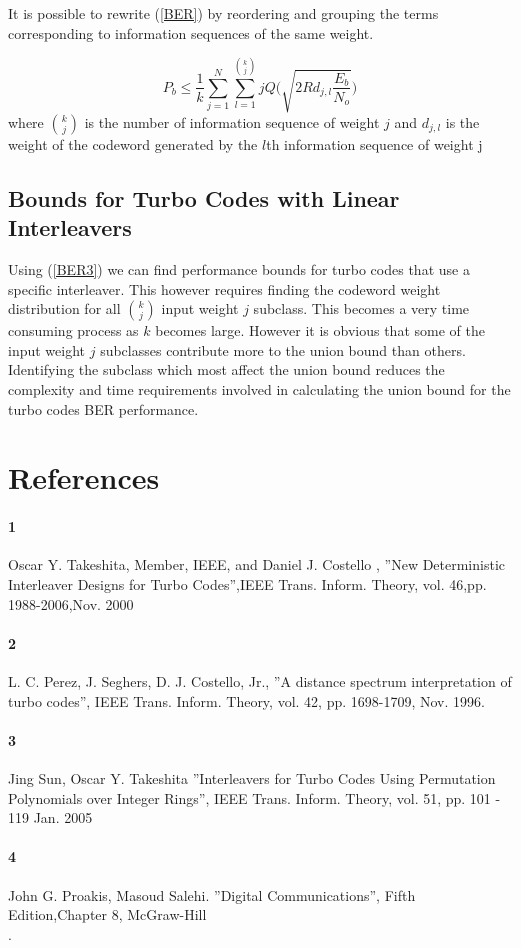 \documentclass[20 pts]{article}
\begin{document}
     It is possible to rewrite (\ref{BER}) by reordering and grouping the terms 
     corresponding to information sequences of the same weight. 
     
     \begin{equation}
     P_b \leq \frac{1}{k}\sum_{j=1}^{N} \sum_{l=1 }^{\binom{k}{j}} j 
     Q\Bigg ( \sqrt{2
    Rd_{j,l}\frac{E_b}{N_o}} \Bigg )
    \label{BER3}
     \end{equation}
    where $\binom{k}{j}$ is the number of information sequence of weight $j$ and
    $d_{j,l}$ is the weight of the codeword generated by the $l$th information 
    sequence of weight j
    
    
    \subsection{Bounds for Turbo Codes with Linear Interleavers}
    Using (\ref{BER3}) we can find performance bounds for turbo codes that use 
    a specific interleaver. This however requires finding the codeword weight 
    distribution for all $\binom{k}{j}$ input weight $j$ subclass. This becomes a very
    time consuming process as $k$ becomes large. However it is obvious that some 
    of the input weight $j$ subclasses contribute more to the union bound than others.
    Identifying the subclass which most affect the union bound reduces the complexity
    and time requirements involved in calculating the union bound for the turbo codes
    BER performance.
\section{References}
\paragraph{1}  Oscar Y. Takeshita, Member, IEEE, and Daniel J. Costello ,
''New Deterministic Interleaver Designs for Turbo Codes'',IEEE Trans. Inform. Theory,
 vol. 46,pp. 1988-2006,Nov. 2000\\
  \paragraph{2} L. C. Perez, J. Seghers, D. J. Costello, Jr., 
  ''A distance spectrum interpretation of turbo codes'', IEEE Trans. Inform. Theory,
   vol. 42, pp. 1698-1709, Nov. 1996.\\
\paragraph{3} Jing Sun, Oscar Y. Takeshita ”Interleavers for Turbo Codes Using 
Permutation Polynomials over Integer Rings”, IEEE Trans. Inform. Theory, vol. 51,
pp. 101 - 119 Jan. 2005\\
\paragraph{4} John G. Proakis, Masoud Salehi. ''Digital Communications'', 
Fifth Edition,Chapter 8, McGraw-Hill\\.
\end{document}
